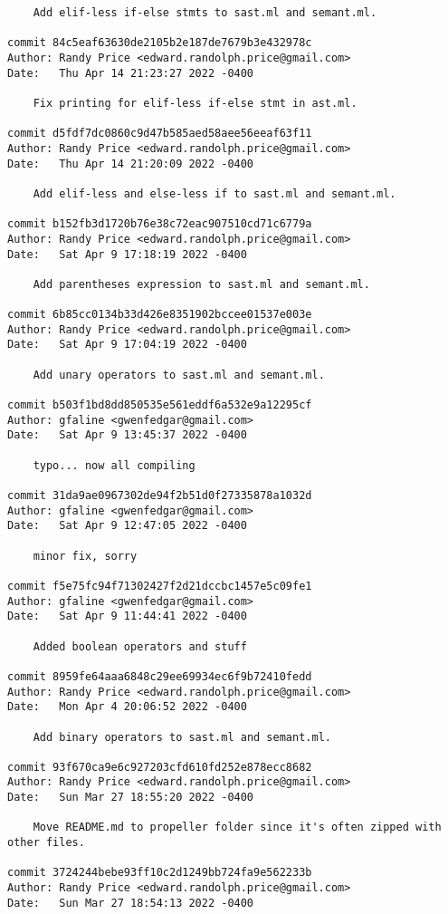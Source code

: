 {\begin{verbatim}
    Add elif-less if-else stmts to sast.ml and semant.ml.

commit 84c5eaf63630de2105b2e187de7679b3e432978c
Author: Randy Price <edward.randolph.price@gmail.com>
Date:   Thu Apr 14 21:23:27 2022 -0400

    Fix printing for elif-less if-else stmt in ast.ml.

commit d5fdf7dc0860c9d47b585aed58aee56eeaf63f11
Author: Randy Price <edward.randolph.price@gmail.com>
Date:   Thu Apr 14 21:20:09 2022 -0400

    Add elif-less and else-less if to sast.ml and semant.ml.

commit b152fb3d1720b76e38c72eac907510cd71c6779a
Author: Randy Price <edward.randolph.price@gmail.com>
Date:   Sat Apr 9 17:18:19 2022 -0400

    Add parentheses expression to sast.ml and semant.ml.

commit 6b85cc0134b33d426e8351902bccee01537e003e
Author: Randy Price <edward.randolph.price@gmail.com>
Date:   Sat Apr 9 17:04:19 2022 -0400

    Add unary operators to sast.ml and semant.ml.

commit b503f1bd8dd850535e561eddf6a532e9a12295cf
Author: gfaline <gwenfedgar@gmail.com>
Date:   Sat Apr 9 13:45:37 2022 -0400

    typo... now all compiling

commit 31da9ae0967302de94f2b51d0f27335878a1032d
Author: gfaline <gwenfedgar@gmail.com>
Date:   Sat Apr 9 12:47:05 2022 -0400

    minor fix, sorry

commit f5e75fc94f71302427f2d21dccbc1457e5c09fe1
Author: gfaline <gwenfedgar@gmail.com>
Date:   Sat Apr 9 11:44:41 2022 -0400

    Added boolean operators and stuff

commit 8959fe64aaa6848c29ee69934ec6f9b72410fedd
Author: Randy Price <edward.randolph.price@gmail.com>
Date:   Mon Apr 4 20:06:52 2022 -0400

    Add binary operators to sast.ml and semant.ml.

commit 93f670ca9e6c927203cfd610fd252e878ecc8682
Author: Randy Price <edward.randolph.price@gmail.com>
Date:   Sun Mar 27 18:55:20 2022 -0400

    Move README.md to propeller folder since it's often zipped with other files.

commit 3724244bebe93ff10c2d1249bb724fa9e562233b
Author: Randy Price <edward.randolph.price@gmail.com>
Date:   Sun Mar 27 18:54:13 2022 -0400


\end{verbatim}}
